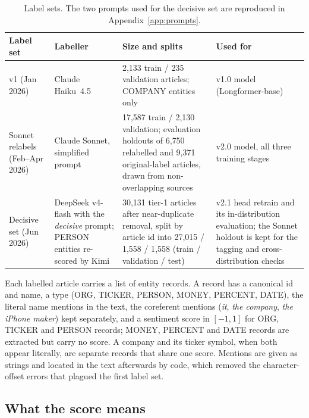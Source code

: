 \documentclass[11pt,letterpaper]{article}
\begin{document}
\begin{table}[H]
\centering\small
\begin{tabularx}{\linewidth}{@{}P{2.5cm}P{3.0cm}YP{3.4cm}@{}}
\toprule
\textbf{Label set} & \textbf{Labeller} & \textbf{Size and splits} & \textbf{Used for} \\
\midrule
v1 (Jan 2026) & Claude Haiku~4.5 & 2{,}133 train / 235 validation articles; COMPANY entities only &
  v1.0 model (Longformer-base) \\
Sonnet relabels (Feb--Apr 2026) & Claude Sonnet, simplified prompt &
  17{,}587 train / 2{,}130 validation; evaluation holdouts of 6{,}750 relabelled and 9{,}371
  original-label articles, drawn from non-overlapping sources &
  v2.0 model, all three training stages \\
Decisive set (Jun 2026) & DeepSeek v4-flash with the \emph{decisive} prompt; PERSON entities
  re-scored by Kimi &
  30{,}131 tier-1 articles after near-duplicate removal, split by article id into 27{,}015 /
  1{,}558 / 1{,}558 (train / validation / test) &
  v2.1 head retrain and its in-distribution evaluation; the Sonnet holdout is kept for the
  tagging and cross-distribution checks \\
\bottomrule
\end{tabularx}
\caption{Label sets. The two prompts used for the decisive set are reproduced in
Appendix~\ref{app:prompts}.}
\label{tab:labels}
\end{table}

Each labelled article carries a list of entity records. A record has a canonical id and name, a
type (ORG, TICKER, PERSON, MONEY, PERCENT, DATE), the literal name mentions in the text, the
coreferent mentions (\emph{it}, \emph{the company}, \emph{the iPhone maker}) kept separately, and
a sentiment score in $[-1, 1]$ for ORG, TICKER and PERSON records; MONEY, PERCENT and DATE
records are extracted but carry no score. A company and its ticker symbol, when both appear
literally, are separate records that share one score. Mentions are given as strings and located
in the text afterwards by code, which removed the character-offset errors that plagued the first
label set.

\subsection{What the score means}
\end{document}
